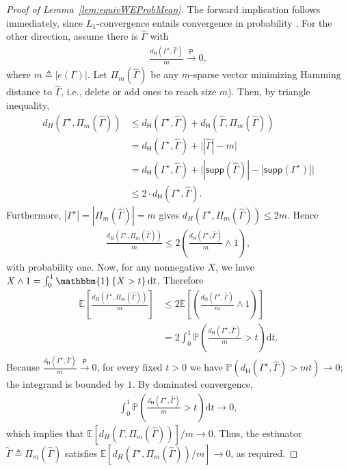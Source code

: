 \documentclass[12pt]{article}
\newcommand{\bE}{\mathbb{E}}
\newcommand{\Ind}{\mathbbm{1}}
\newcommand{\ppp}[1]{\left\{#1\right\}}
\newcommand{\s}[1]{\mathsf{#1}}
\begin{document}
\begin{proof}[Proof of Lemma~\ref{lem:equivWEProbMean}]
The forward implication follows immediately, since $L_1$-convergence entails convergence in probability \cite[Proposition 6.14]{Folland1999}. For the other direction, assume there is $\hat{\Gamma}$ with
\begin{align}
\frac{d_\s{H}(\Gamma^\star,\hat{\Gamma})}{m} \xrightarrow{\mathsf{P}} 0,
\end{align}
where $m\triangleq|e(\Gamma)|$. Let $\Pi_m(\hat{\Gamma})$ be any $m$-sparse vector minimizing Hamming distance to $\hat{\Gamma}$, i.e., delete or add ones to reach size $m$). Then, by triangle inequality,
\begin{align}
d_{H}(\Gamma^\star,\Pi_m(\hat{\Gamma})) &\leq d_{\s{H}}(\Gamma^\star,\hat{\Gamma}) + d_{\s{H}}(\hat{\Gamma},\Pi_m(\hat{\Gamma}))\\
&= d_{\s{H}}(\Gamma^\star,\hat{\Gamma}) + \big||\hat{\Gamma}| - m\big| \\
& = d_{\s{H}}(\Gamma^\star,\hat{\Gamma}) + \big||\s{supp}(\hat{\Gamma})| - |\s{supp}(\Gamma^\star)|\big|\\
&\leq 2\cdot d_{\s{H}}(\Gamma^\star,\hat{\Gamma}).
\end{align}
Furthermore, $|\Gamma^\star| = |\Pi_m(\hat{\Gamma})| = m$ gives $d_{H}(\Gamma^\star,\Pi_m(\hat{\Gamma})) \leq 2m$. Hence
\begin{align}
\frac{d_{H}(\Gamma^\star,\Pi_m(\hat{\Gamma}))}{m} \leq 2\left(\frac{d_{\s{H}}(\Gamma^\star,\hat{\Gamma})}{m} \wedge 1\right),
\end{align}
with probability one. Now, for any nonnegative $X$, we have $X \wedge 1 = \int_0^1 \Ind\ppp{X > t}\mathrm{d}t$. Therefore
\begin{align}
\mathbb{E}\left[\frac{d_{H}(\Gamma^\star,\Pi_m(\hat{\Gamma}))}{m}\right] &\leq 2\mathbb{E}\left[\left(\frac{d_{\s{H}}(\Gamma^\star,\hat{\Gamma})}{m} \wedge 1\right)\right]\\
&= 2 \int_0^1 \mathbb{P}\left(\frac{d_{\s{H}}(\Gamma^\star,\hat{\Gamma})}{m} > t\right)\mathrm{d}t.
\end{align}
Because $\frac{d_\s{H}(\Gamma^\star,\hat{\Gamma})}{m} \xrightarrow{\mathsf{P}} 0$, for every fixed $t>0$ we have $\mathbb{P}(d_\s{H}(\Gamma^\star,\hat{\Gamma}) > mt) \to 0$; the integrand is bounded by $1$. By dominated convergence,
\begin{align}
 \int_0^1 \mathbb{P}\left(\frac{d_{\s{H}}(\Gamma^\star,\hat{\Gamma})}{m} > t\right)\mathrm{d}t\to 0,
\end{align}
which implies that $\mathbb{E}[d_{H}(\Gamma,\Pi_m(\hat{\Gamma}))]/m \to 0$. Thus, the estimator $\tilde{\Gamma} \triangleq  \Pi_m(\hat{\Gamma})$ satisfies $\mathbb{E}[d_{H}(\Gamma^\star,\Pi_m(\hat{\Gamma}))/m] \to 0$, as required. 
\end{proof}
\end{document}

